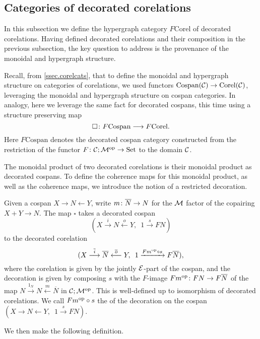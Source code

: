 \subsection{Categories of decorated corelations} \label{ssec.deccorelcats}

In this subsection we define the hypergraph category $F\mathrm{Corel}$ of
decorated corelations. Having defined decorated corelations and their
composition in the previous subsection, the key question to address is the
provenance of the monoidal and hypergraph structure. 

Recall, from \textsection\ref{ssec.corelcats}, that to define the monoidal and hypergraph
structure on categories of corelations, we used functors $\mathrm{Cospan}(\mathcal C)
\to \mathrm{Corel}(\mathcal C)$, leveraging the monoidal and hypergraph structure on
cospan categories. In analogy, here we leverage the same fact for decorated
cospans, this time using a structure preserving map 
\[
  \square{\colon} F\mathrm{Cospan} \longrightarrow F\mathrm{Corel}.
\]
Here $F\mathrm{Cospan}$ denotes the decorated cospan category constructed from
the restriction of the functor $F{\colon} \mathcal C;\mathcal M^{\mathrm{op}} \to \mathrm{Set}$ to the domain
$\mathcal C$. 

The monoidal product of two decorated corelations is their monoidal product as
decorated cospans. To define the coherence maps for this monoidal product, as
well as the coherence maps, we introduce the notion of a restricted decoration.

Given a cospan $X \to N \leftarrow Y$, write $m{\colon} \overline{N} \to N$ for the
$\mathcal M$ factor of the copairing $X+Y \to N$. The map $\square$ takes a
decorated cospan 
\[
  (X \stackrel{i}\longrightarrow N \stackrel{o}\longleftarrow Y, \enspace 1
    \stackrel{s}\longrightarrow FN)
\]
to the decorated corelation 
\[
  (X \stackrel{\overline{i}}\longrightarrow \overline N
  \stackrel{\overline{o}}{\longleftarrow} Y, \enspace 1 \xrightarrow{Fm^{\mathrm{op}} \circ
  s} F\overline{N}),
\]
where the corelation is given by the jointly $\mathcal E$-part of the cospan, and the
decoration is given by composing $s$ with the $F$-image $Fm^{\mathrm{op}}{\colon} FN \to
F\overline{N}$ of the map $N \stackrel{1_N}\to N \stackrel{m}\leftarrow
\overline{N}$ in $\mathcal C;\mathcal M^{\mathrm{op}}$. This is well-defined up to isomorphism of
decorated corelations. We call $Fm^{\mathrm{op}} \circ s$ the  of the decoration on the cospan $(X \to N \leftarrow Y, \enspace 1
\stackrel{s}\to FN)$.

We then make the following definition.


